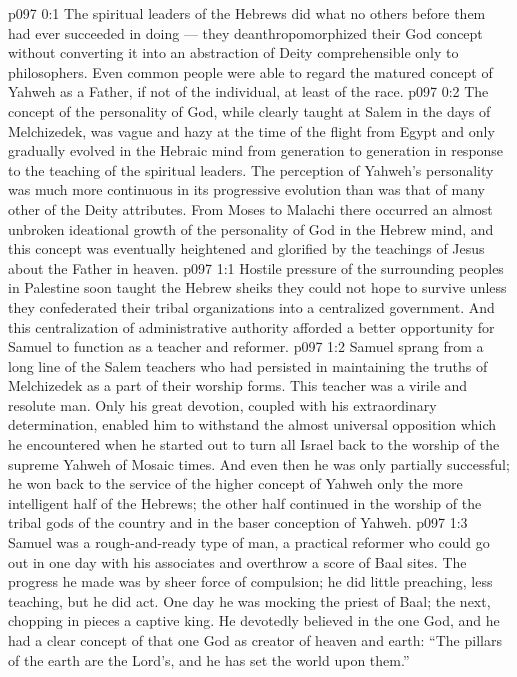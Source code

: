 \author{Melchizedek}
\vs p097 0:1 The spiritual leaders of the Hebrews did what no others before them had ever succeeded in doing --- they deanthropomorphized their God concept without converting it into an abstraction of Deity comprehensible only to philosophers. Even common people were able to regard the matured concept of Yahweh as a Father, if not of the individual, at least of the race.
\vs p097 0:2 The concept of the personality of God, while clearly taught at Salem in the days of Melchizedek, was vague and hazy at the time of the flight from Egypt and only gradually evolved in the Hebraic mind from generation to generation in response to the teaching of the spiritual leaders. The perception of Yahweh’s personality was much more continuous in its progressive evolution than was that of many other of the Deity attributes. From Moses to Malachi there occurred an almost unbroken ideational growth of the personality of God in the Hebrew mind, and this concept was eventually heightened and glorified by the teachings of Jesus about the Father in heaven.
\vs p097 1:1 Hostile pressure of the surrounding peoples in Palestine soon taught the Hebrew sheiks they could not hope to survive unless they confederated their tribal organizations into a centralized government. And this centralization of administrative authority afforded a better opportunity for Samuel to function as a teacher and reformer.
\vs p097 1:2 Samuel sprang from a long line of the Salem teachers who had persisted in maintaining the truths of Melchizedek as a part of their worship forms. This teacher was a virile and resolute man. Only his great devotion, coupled with his extraordinary determination, enabled him to withstand the almost universal opposition which he encountered when he started out to turn all Israel back to the worship of the supreme Yahweh of Mosaic times. And even then he was only partially successful; he won back to the service of the higher concept of Yahweh only the more intelligent half of the Hebrews; the other half continued in the worship of the tribal gods of the country and in the baser conception of Yahweh.
\vs p097 1:3 Samuel was a rough\hyp{}and\hyp{}ready type of man, a practical reformer who could go out in one day with his associates and overthrow a score of Baal sites. The progress he made was by sheer force of compulsion; he did little preaching, less teaching, but he did act. One day he was mocking the priest of Baal; the next, chopping in pieces a captive king. He devotedly believed in the one God, and he had a clear concept of that one God as creator of heaven and earth: “The pillars of the earth are the Lord’s, and he has set the world upon them.”

